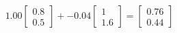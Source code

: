 \documentclass[preview]{standalone}
\begin{document}
\begin{align*}
1.00 \begin{bmatrix} 0.8 \\ 0.5 \end{bmatrix} + -0.04 \begin{bmatrix} 1 \\ 1.6 \end{bmatrix} = \begin{bmatrix} 0.76 \\ 0.44 \end{bmatrix}
\end{align*}
\end{document}

